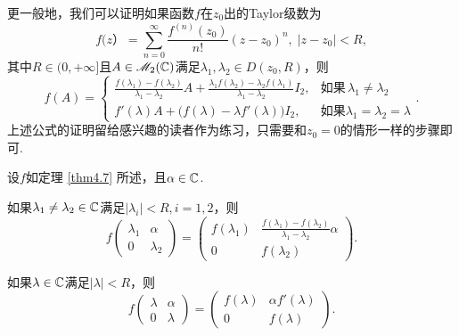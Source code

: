 \begin{mybox}
  \begin{remark}
    更一般地，我们可以证明如果函数$f$在$z_0$出的Taylor级数为
    \[
      f(z） = \sum_{n=0}^\infty \frac{f^{(n)}(z_0)}{n!}(z - z_0)^n,\; |z-z_0|<R,
    \]
    其中$R\in(0,+\infty]$且$A\in\mathscr M_2(\mathbb C)$满足$\lambda_1,\lambda_2\in D(z_0,R)$，则
    \[
      f(A) = \begin{cases}
        \frac{f(\lambda_1) - f(\lambda_2)}{\lambda_1 - \lambda_2}A + \frac{\lambda_1f(\lambda_2) - \lambda_2f(\lambda_1)}{\lambda_1 - \lambda_2} I_2, & \text{如果}\, \lambda_1\ne \lambda_2 \\
        f'(\lambda)A + \big( f(\lambda) - \lambda f'(\lambda) \big)I_2, & \text{如果} \lambda_1 = \lambda_2 = \lambda
     \end{cases}.
    \]
    上述公式的证明留给感兴趣的读者作为练习，只需要和$z_0=0$的情形一样的步骤即可.
  \end{remark}
\end{mybox}

\begin{mybox}
  \begin{corollary}
    设$f$如定理 \ref{thm4.7} 所述，且$\alpha\in\mathbb C$.
    \begin{enum}
      \item 如果$\lambda_1\ne\lambda_2\in\mathbb C$满足$|\lambda_i|<R,i=1,2$，则
          \[
            f\begin{pmatrix}
              \lambda_1 & \alpha \\
              0 & \lambda_2
            \end{pmatrix} = \begin{pmatrix}
              f(\lambda_1) & \frac{f(\lambda_1)-
              f(\lambda_2)}{\lambda_1-\lambda_2}\alpha \\
              0 & f(\lambda_2)
            \end{pmatrix}.
          \]
      \item 如果$\lambda\in\mathbb C$满足$|\lambda|<R$，则
      \[
         f\begin{pmatrix}
           \lambda & \alpha \\
           0 & \lambda
         \end{pmatrix} = \begin{pmatrix}
           f(\lambda) & \alpha f'(\lambda) \\
           0 & f(\lambda)
         \end{pmatrix}.
      \]
    \end{enum}
  \end{corollary}
\end{mybox}

